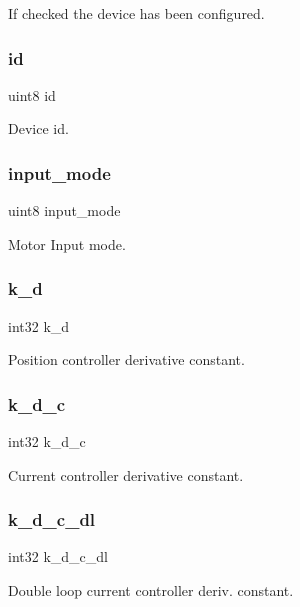 If checked the device has been configured. \mbox{\label{structst__mem_a492bfda30c3852a68b2cbfba9531e3d1}} 
\subsubsection{id}
{\footnotesize\ttfamily uint8 id}

Device id. \mbox{\label{structst__mem_ae5cc8b2ae06016f1fcf5b2f964618a12}} 
\subsubsection{input\+\_\+mode}
{\footnotesize\ttfamily uint8 input\+\_\+mode}

Motor Input mode. \mbox{\label{structst__mem_ab9d15eaa4612dd1c5597e5634cd1d66c}} 
\subsubsection{k\+\_\+d}
{\footnotesize\ttfamily int32 k\+\_\+d}

Position controller derivative constant. \mbox{\label{structst__mem_af32cf4ebfb30ad068ea530d03ff9a96f}} 
\subsubsection{k\+\_\+d\+\_\+c}
{\footnotesize\ttfamily int32 k\+\_\+d\+\_\+c}

Current controller derivative constant. \mbox{\label{structst__mem_af8bfba55a00d54c9c2a9e4bb11484158}} 
\subsubsection{k\+\_\+d\+\_\+c\+\_\+dl}
{\footnotesize\ttfamily int32 k\+\_\+d\+\_\+c\+\_\+dl}

Double loop current controller deriv. constant. \mbox{\label{structst__mem_adc3d57142df06bc753d1982fa409ffea}} 
